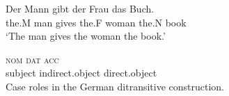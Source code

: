 \documentclass{article}
\begin{document}
\begin{exe}
  \ex
  \gll Der Mann gibt der Frau das Buch. \\
       the.M man gives the.F woman the.N book \\
  \trans `The man gives the woman the book.'


  \gll \textsc{nom} \textsc{dat} \textsc{acc} \\
       subject indirect.object direct.object \\
  \trans Case roles in the German ditransitive construction.
\end{exe}
\end{document}
